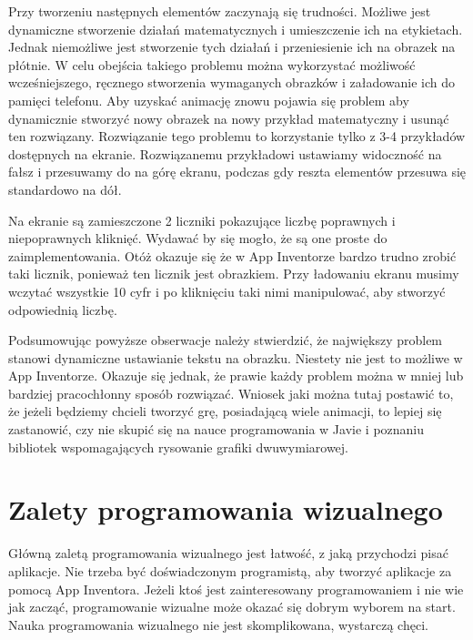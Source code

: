 Przy tworzeniu następnych elementów zaczynają się trudności. Możliwe jest dynamiczne stworzenie działań matematycznych i umieszczenie ich na etykietach. Jednak niemożliwe jest stworzenie tych działań i przeniesienie ich na obrazek na płótnie. W celu obejścia takiego problemu można wykorzystać możliwość wcześniejszego, ręcznego stworzenia wymaganych obrazków i załadowanie ich do pamięci telefonu. Aby uzyskać animację znowu pojawia się problem aby dynamicznie stworzyć nowy obrazek na nowy przykład matematyczny i usunąć ten rozwiązany. Rozwiązanie tego problemu to korzystanie tylko z 3-4 przykładów dostępnych na ekranie. Rozwiązanemu przykładowi ustawiamy widoczność na fałsz i przesuwamy do na górę ekranu, podczas gdy reszta elementów przesuwa się standardowo na dół.

Na ekranie są zamieszczone 2 liczniki pokazujące liczbę poprawnych i niepoprawnych kliknięć. Wydawać by się mogło, że są one proste do zaimplementowania. Otóż okazuje się że w App Inventorze bardzo trudno zrobić taki licznik, ponieważ ten licznik jest obrazkiem. Przy ładowaniu ekranu musimy wczytać wszystkie 10 cyfr i po kliknięciu taki nimi manipulować, aby stworzyć odpowiednią liczbę.

Podsumowując powyższe obserwacje należy stwierdzić, że największy problem stanowi dynamiczne ustawianie tekstu na obrazku. Niestety nie jest to możliwe w App Inventorze. Okazuje się jednak, że prawie każdy problem można w mniej lub bardziej pracochłonny sposób rozwiązać. Wniosek jaki można tutaj postawić to, że jeżeli będziemy chcieli tworzyć grę, posiadającą wiele animacji, to lepiej się zastanowić, czy nie skupić się na nauce programowania w Javie i poznaniu bibliotek wspomagających rysowanie grafiki dwuwymiarowej.







\section{Zalety programowania wizualnego}

Główną zaletą programowania wizualnego jest łatwość, z jaką przychodzi pisać aplikacje. Nie trzeba być doświadczonym programistą, aby tworzyć aplikacje za pomocą App Inventora. Jeżeli ktoś jest zainteresowany programowaniem i nie wie jak zacząć, programowanie wizualne może okazać się dobrym wyborem na start. Nauka programowania wizualnego nie jest skomplikowana, wystarczą chęci. 

